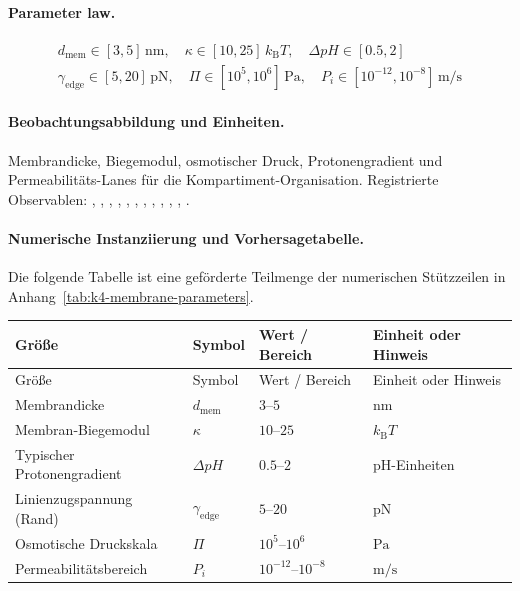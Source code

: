 \paragraph{Parameter law.}
\[
\begin{gathered} d_{\mathrm{mem}} \in [3, 5]\,\mathrm{nm},\quad \kappa \in [10, 25]\,k_{\mathrm{B}}T,\quad \Delta pH \in [0.5, 2] \\ \gamma_{\mathrm{edge}} \in [5,20]\,\mathrm{pN},\quad \Pi \in [10^5,10^6]\,\mathrm{Pa},\quad P_i \in [10^{-12},10^{-8}]\,\mathrm{m/s} \end{gathered}
\]

\paragraph{Beobachtungsabbildung und Einheiten.}
Membrandicke, Biegemodul, osmotischer Druck, Protonengradient und Permeabilitäts-Lanes für die Kompartiment-Organisation.
Registrierte Observablen: , \allowbreak {}, \allowbreak {}, \allowbreak {}, \allowbreak {}, \allowbreak {}, \allowbreak {}, \allowbreak {}, \allowbreak {}, \allowbreak {}, \allowbreak {}, \allowbreak {}.

\paragraph{Numerische Instanziierung und Vorhersagetabelle.}
Die folgende Tabelle ist eine geförderte Teilmenge der numerischen Stützzeilen in Anhang~\ref{tab:k4-membrane-parameters}.
\begin{longtable}{@{}L{0.27\textwidth}L{0.15\textwidth}L{0.24\textwidth}L{0.16\textwidth}@{}}
\toprule
Größe & Symbol & Wert / Bereich & Einheit oder Hinweis \\
\midrule
\endfirsthead
\toprule
Größe & Symbol & Wert / Bereich & Einheit oder Hinweis \\
\midrule
\endhead
Membrandicke & $\scriptstyle d_{\mathrm{mem}}$ & $3\text{--}5$ & $\mathrm{nm}$ \\
Membran-Biegemodul & $\scriptstyle \kappa$ & $10\text{--}25$ & $k_{\mathrm{B}}T$ \\
Typischer Protonengradient & $\scriptstyle \Delta pH$ & $0.5\text{--}2$ & pH-Einheiten \\
Linienzugspannung (Rand) & $\scriptstyle \gamma_{\mathrm{edge}}$ & $5\text{--}20$ & $\mathrm{pN}$ \\
Osmotische Druckskala & $\scriptstyle \Pi$ & $10^5\text{--}10^6$ & $\mathrm{Pa}$ \\
Permeabilitätsbereich & $\scriptstyle P_i$ & $10^{-12}\text{--}10^{-8}$ & $\mathrm{m/s}$ \\
\bottomrule
\end{longtable}

